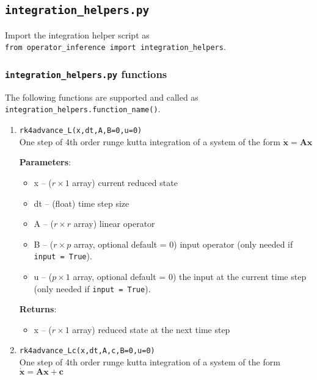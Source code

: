 \documentclass[11pt]{article} %
\newcommand{\code}[1]{\colorbox{light-gray}{\texttt{#1}}}
\newcommand{\bx}{\mathbf{x}}
\newcommand{\bA}{\mathbf{A}}
\newcommand{\bc}{\mathbf{c}}
\begin{document}
\subsection{\code{integration\_helpers.py}}
Import the integration helper script as\\
 \indent \code{from operator\_inference import integration\_helpers}. \\


\subsubsection{\code{integration\_helpers.py} functions}
\label{sec:integrationhelpersfunctions}
 The following functions are supported and called as \code{integration\_helpers.function\_name()}. 
\begin{enumerate}
\item{\code{rk4advance\_L(x,dt,A,B=0,u=0)}}\\
One step of 4th order runge kutta integration of a system of the form $\dot{\bx} = \bA\bx$

\textbf{Parameters}:
	\begin{itemize}
	\item[] x -- ($r\times 1$ array) current reduced state 
	\item[] dt -- (float) time step size
	\item[] A -- ($r \times r$ array) linear operator
	\item[] B -- ($r \times p$ array, optional default = 0) input operator (only needed if \code{input = True}).
	\item[] u -- ($p \times 1$ array, optional default = 0) the input at the current time step (only needed if \code{input = True}).
	\end{itemize}
\textbf{Returns}:
\begin{itemize}
\item[] x -- ($r \times 1$ array) reduced state at the next time step
\end{itemize}

\item{\code{rk4advance\_Lc(x,dt,A,c,B=0,u=0)}}\\
One step of 4th order runge kutta integration of a system of the form $\dot{\bx} = \bA\bx + \bc$


\end{enumerate}
\end{document}
